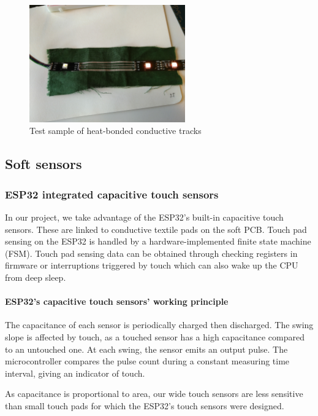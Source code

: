 \begin{figure}[ht]
    \centering
    \includegraphics[width=0.6\textwidth, angle=-90]{images/HW/heatbond_tracks2.jpg}
    \caption{Test sample of heat-bonded conductive tracks}
    \label{fig:heat_tracks}
\end{figure}

\subsection{Soft sensors}
    \subsubsection{ESP32 integrated capacitive touch sensors}
In our project, we take advantage of the ESP32's built-in capacitive touch sensors. These are linked to conductive textile pads on the soft PCB. 
\medskip
Touch pad sensing on the ESP32 is handled by a hardware-implemented finite state machine (FSM). Touch pad sensing data can be obtained through checking registers in firmware or interruptions triggered by touch which can also wake up the CPU from deep sleep.

\paragraph{ESP32's capacitive touch sensors' working principle} 
The capacitance of each sensor is periodically charged then discharged. The swing slope is affected by touch, as a touched sensor has a high capacitance compared to an untouched one. At each swing, the sensor emits an output pulse. The microcontroller compares the pulse count during a constant measuring time interval, giving an indicator of touch.

As capacitance is proportional to area, our wide touch sensors are less sensitive than small touch pads for which the ESP32's touch sensors were designed.

